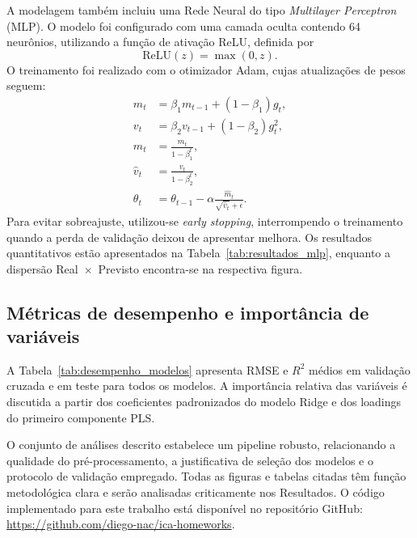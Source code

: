 A modelagem tamb\'em incluiu uma Rede Neural do tipo \textit{Multilayer Perceptron} (MLP). O modelo foi configurado com uma camada oculta contendo 64 neur\^onios, utilizando a fun\c{c}\~ao de ativa\c{c}\~ao ReLU, definida por
\begin{equation}
\text{ReLU}(z) = \max(0, z).
\end{equation}
O treinamento foi realizado com o otimizador Adam, cujas atualiza\c{c}\~oes de pesos seguem:
\begin{align}
m_t &= \beta_1 m_{t-1} + (1-\beta_1) g_t, \\
v_t &= \beta_2 v_{t-1} + (1-\beta_2) g_t^2, \\
\hat{m}_t &= \frac{m_t}{1-\beta_1^t}, \\
\hat{v}_t &= \frac{v_t}{1-\beta_2^t}, \\
\theta_t &= \theta_{t-1} - \alpha \frac{\hat{m}_t}{\sqrt{\hat{v}_t} + \epsilon}.
\end{align}
Para evitar sobreajuste, utilizou-se \textit{early stopping}, interrompendo o treinamento quando a perda de valida\c{c}\~ao deixou de apresentar melhora. Os resultados quantitativos est\~ao apresentados na Tabela~\ref{tab:resultados_mlp}, enquanto a dispers\~ao Real~$\times$~Previsto encontra-se na respectiva figura.


\subsection{Métricas de desempenho e importância de variáveis}
\label{subsec:metrics}

A Tabela~\ref{tab:desempenho_modelos} apresenta RMSE e $R^2$ médios em validação cruzada e em teste para todos os modelos. A importância relativa das variáveis é discutida a partir dos coeficientes padronizados do modelo Ridge e dos loadings do primeiro componente PLS.

O conjunto de análises descrito estabelece um pipeline robusto, relacionando a qualidade do pré-processamento, a justificativa de seleção dos modelos e o protocolo de validação empregado. Todas as figuras e tabelas citadas têm função metodológica clara e serão analisadas criticamente nos Resultados. O código implementado para este trabalho está disponível no repositório GitHub: \url{https://github.com/diego-nac/ica-homeworks}.
